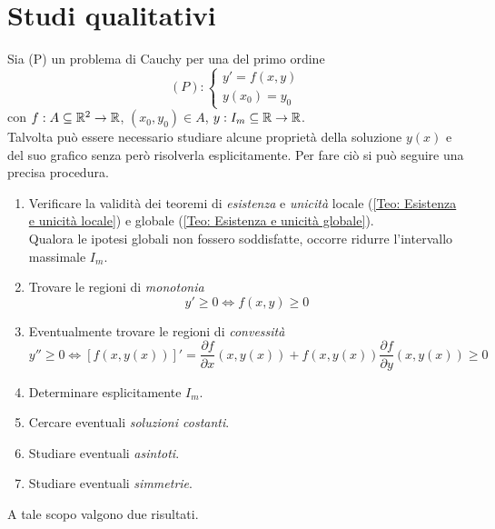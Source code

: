 \section{Studi qualitativi}
Sia (P) un problema di Cauchy per una \ode del primo ordine
\begin{equation*}
    (P): \begin{cases}
        y'=f(x,y)\\
        y(x_0)=y_0
    \end{cases}
\end{equation*}
con $f: A \subseteq \mathbb{R}^2 \to \mathbb{R}$, $(x_0, y_0) \in A$, $y:I_m \subseteq \mathbb{R} \to \mathbb{R}$.\\
Talvolta può essere necessario studiare alcune proprietà della soluzione $y(x)$ e del suo grafico senza però risolverla esplicitamente.
Per fare ciò si può seguire una precisa procedura.
\begin{enumerate}
    \item Verificare la validità dei teoremi di \textit{esistenza} e \textit{unicità} locale (\ref{Teo: Esistenza e unicità locale}) e globale (\ref{Teo: Esistenza e unicità globale}).\\
    Qualora le ipotesi globali non fossero soddisfatte, occorre ridurre l'intervallo massimale $I_m$.
    \item Trovare le regioni di \textit{monotonia}
    \begin{equation*}
        y'\geq 0 \iff f(x,y) \geq 0
    \end{equation*}
    \item Eventualmente trovare le regioni di \textit{convessità}
    \begin{equation*}
        y'' \geq 0 \iff [f(x,y(x))]' = \frac{\partial f}{\partial x}(x,y(x))+ f(x,y(x)) \frac{\partial f}{\partial y}(x,y(x)) \geq 0
    \end{equation*}
    \item Determinare esplicitamente $I_m$.
    \item Cercare eventuali \textit{soluzioni costanti}.
    \item Studiare eventuali \textit{asintoti}.
    \item Studiare eventuali \textit{simmetrie}.
\end{enumerate}
A tale scopo valgono due risultati.
